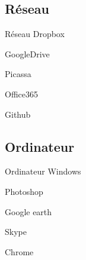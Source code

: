 \documentclass{beamer}
\begin{document}
\subsection{Réseau}
\begin{frame}{Réseau}
\noindent\vspace{0.1in}\hspace{1.0in} Dropbox \par
\noindent\vspace{0.1in}\hspace{2.5in} GoogleDrive \par
\noindent\vspace{0.1in}\hspace{1.5in} Picassa \par
\noindent\vspace{0.1in}\hspace{0.2in} Office365 \par
\noindent\vspace{0.1in}\hspace{3.5in} Github \par
\end{frame}

\subsection{Ordinateur}
\begin{frame}{Ordinateur}
\noindent\vspace{0.1in}\hspace{1.2in} Windows \par
\noindent\vspace{0.1in}\hspace{2.7in} Photoshop \par
\noindent\vspace{0.1in}\hspace{1.7in} Google earth \par
\noindent\vspace{0.1in}\hspace{0.4in} Skype \par
\noindent\vspace{0.1in}\hspace{2.8in} Chrome \par
\end{frame}
\end{document}

